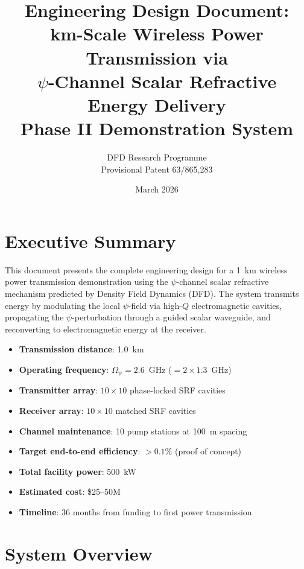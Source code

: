\documentclass[11pt,letterpaper]{article}
\title{Engineering Design Document:\\
\textbf{km-Scale Wireless Power Transmission via\\
$\psi$-Channel Scalar Refractive Energy Delivery}\\[1em]
\large Phase II Demonstration System}
\author{DFD Research Programme\\
Provisional Patent 63/865,283}
\date{March 2026}
\begin{document}
\maketitle
\tableofcontents
\newpage

\section{Executive Summary}

This document presents the complete engineering design for a 1~km
wireless power transmission demonstration using the $\psi$-channel
scalar refractive mechanism predicted by Density Field Dynamics (DFD).
The system transmits energy by modulating the local $\psi$-field via
high-$Q$ electromagnetic cavities, propagating the $\psi$-perturbation
through a guided scalar waveguide, and reconverting to electromagnetic
energy at the receiver.

\begin{tcolorbox}[colback=blue!5!white, colframe=blue!50!black,
title=Key Design Parameters]
\begin{itemize}[nosep]
\item \textbf{Transmission distance}: 1.0~km
\item \textbf{Operating frequency}: $\Omega_\psi = 2.6$~GHz ($= 2 \times 1.3$~GHz)
\item \textbf{Transmitter array}: $10 \times 10$ phase-locked SRF cavities
\item \textbf{Receiver array}: $10 \times 10$ matched SRF cavities
\item \textbf{Channel maintenance}: 10 pump stations at 100~m spacing
\item \textbf{Target end-to-end efficiency}: $> 0.1\%$ (proof of concept)
\item \textbf{Total facility power}: 500~kW
\item \textbf{Estimated cost}: \$25--50M
\item \textbf{Timeline}: 36 months from funding to first power transmission
\end{itemize}
\end{tcolorbox}

\section{System Overview}
\end{document}
